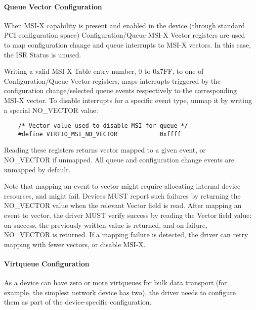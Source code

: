 \paragraph{Queue Vector Configuration}\label{sec:Virtio Transport Options / Virtio Over PCI Bus / PCI-specific Initialization And Device Operation / Device Initialization / Queue Vector Configuration}

When MSI-X capability is present and enabled in the device
(through standard PCI configuration space) Configuration/Queue
MSI-X Vector registers are used to map configuration change and queue
interrupts to MSI-X vectors. In this case, the ISR Status is unused.

Writing a valid MSI-X Table entry number, 0 to 0x7FF, to one of
Configuration/Queue Vector registers, maps interrupts triggered
by the configuration change/selected queue events respectively to
the corresponding MSI-X vector. To disable interrupts for a
specific event type, unmap it by writing a special NO_VECTOR
value:

\begin{lstlisting}
	/* Vector value used to disable MSI for queue */
	#define VIRTIO_MSI_NO_VECTOR            0xffff
\end{lstlisting}

Reading these registers returns vector mapped to a given event,
or NO_VECTOR if unmapped. All queue and configuration change
events are unmapped by default.

Note that mapping an event to vector might require allocating
internal device resources, and might fail. Devices MUST report such
failures by returning the NO_VECTOR value when the relevant
Vector field is read. After mapping an event to vector, the
driver MUST verify success by reading the Vector field value: on
success, the previously written value is returned, and on
failure, NO_VECTOR is returned. If a mapping failure is detected,
the driver can retry mapping with fewer vectors, or disable MSI-X.

\paragraph{Virtqueue Configuration}\label{sec:Virtio Transport Options / Virtio Over PCI Bus / PCI-specific Initialization And Device Operation / Device Initialization / Virtqueue Configuration}

As a device can have zero or more virtqueues for bulk data
transport (for example, the simplest network device has two), the driver
needs to configure them as part of the device-specific
configuration.

